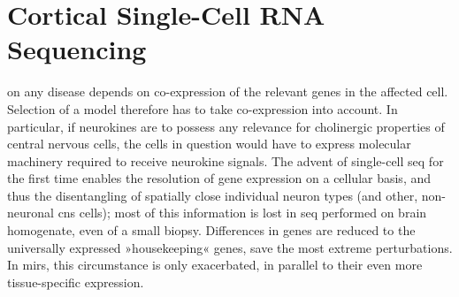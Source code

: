 \section{Cortical Single-Cell RNA Sequencing} \label{sec:cellculture:singlecell}
 on any disease depends on co-expression of the relevant genes in the affected cell. Selection of a model therefore has to take co-expression into account. In particular, if neurokines are to possess any relevance for cholinergic properties of central nervous cells, the cells in question would have to express molecular machinery required to receive neurokine signals. The advent of single-cell \ac{seq} for the first time enables the resolution of gene expression on a cellular basis, and thus the disentangling of spatially close individual neuron types (and other, non-neuronal \ac{cns} cells); most of this information is lost in \ac{seq} performed on brain homogenate, even of a small biopsy. Differences in genes are reduced to the universally expressed »housekeeping« genes, save the most extreme perturbations. In \acp{mir}, this circumstance is only exacerbated, in parallel to their even more tissue-specific expression.

